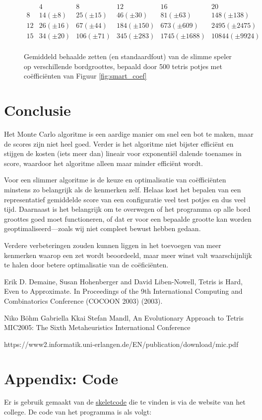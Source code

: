 \documentclass[10pt]{article}
\begin{document}
\begin{figure}
$$\begin{array}{l||c|c|c|c|c}
	    & 4 			& 8 			   & 12 			& 16 			 & 20 \\ 
	\hline\hline
	8  & 14 (\pm 8) 	& 25 (\pm 15) & 46 (\pm 30)  & 81 (\pm 63)  & 148 (\pm 138) \\
	12 & 26 (\pm 16) & 67 (\pm 44)    & 184 (\pm 150)     & 673 (\pm 609) & 2495 (\pm 2475)  \\
	15 & 34 (\pm 20) & 106 (\pm 71) & 345 (\pm 283)     & 1745 (\pm 1688) & 10844 (\pm 9924) \\
\end{array}$$
\caption{Gemiddeld behaalde zetten (en standaardfout) van de slimme speler op verschillende bordgroottes, bepaald door 500 tetris potjes met co\"effici\"enten van Figuur \ref{fig:smart_coef}}\label{fig:smart_bord}
\end{figure}

\section{Conclusie}

Het Monte Carlo algoritme is een aardige manier om snel een bot te maken, maar de scores zijn niet heel goed. Verder is het algoritme niet bijster effici\"ent en stijgen de kosten (iets meer dan) lineair voor exponenti\"el dalende toenames in score, waardoor het algoritme alleen maar minder effici\"ent wordt.

Voor een slimmer algoritme is de keuze en optimalisatie van co\"effici\"enten minstens zo belangrijk als de kenmerken zelf. Helaas kost het bepalen van een representatief gemiddelde score van een configuratie veel test potjes en dus veel tijd. Daarnaast is het belangrijk om te overwegen of het programma op alle bord groottes goed moet functioneren, of dat er voor een bepaalde grootte kan worden geoptimaliseerd---zoals wij niet compleet bewust hebben gedaan.

Verdere verbeteringen zouden kunnen liggen in het toevoegen van meer kenmerken waarop een zet wordt beoordeeld, maar meer winst valt waarschijnlijk te halen door betere optimalisatie van de co\"efici\"enten. 

\begin{thebibliography}{XX}

Erik D. Demaine, Susan Hohenberger and David Liben-Nowell, Tetris is
Hard, Even to Approximate. In Proceedings of the 9th International Computing and
Combinatorics Conference (COCOON 2003) (2003).

Niko B\"{o}hm Gabriella Kkai Stefan Mandl,
An Evolutionary Approach to Tetris
MIC2005: The Sixth Metaheuristics International Conference

https://www2.informatik.uni-erlangen.de/EN/publication/download/mic.pdf

\end{thebibliography}

\section*{Appendix: Code}

Er is gebruik gemaakt van de \href{http://www.liacs.leidenuniv.nl/~kosterswa/AI/iets.cc}{\underline{skeletcode}} die te vinden is via
de website van het college.
De code van het programma is als volgt:

\smallskip


\end{document}
